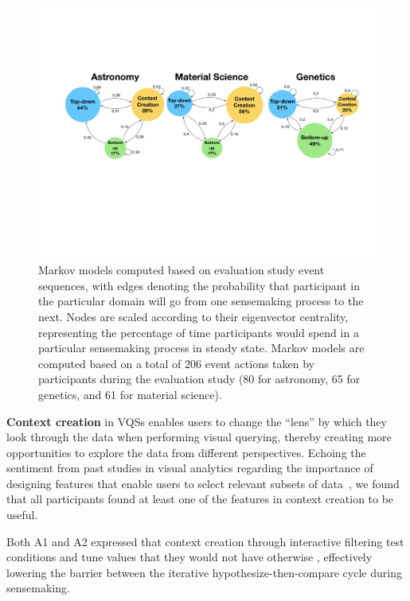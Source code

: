  \begin{figure}[ht!]
   \centering
   \includegraphics[width=0.6\linewidth]{figures/markov_transition.pdf}
   \caption{Markov models computed based on evaluation study event sequences, with edges denoting the probability that participant in the particular domain will go from one sensemaking process to the next. Nodes are scaled according to their eigenvector centrality, representing the percentage of time participants would spend in a particular sensemaking process in steady state. Markov models are computed based on a total of 206 event actions taken by participants during the evaluation study (80 for astronomy, 65 for genetics, and 61 for material science).}\label{fig:transition}
   \vspace*{-15pt}
 \end{figure}
 \par \textbf{Context creation} in VQSs enables users to change the ``lens''
 by which they look through the data
 when performing visual querying,
 thereby creating more opportunities
 to explore the data from different perspectives. Echoing the sentiment from past studies in visual analytics regarding the importance of designing features that enable users to select relevant subsets of data~\cite{Shneiderman1994,Amar2005,Heer2012}, we found that all participants found at least one of the features in context creation to be useful.
 \par Both A1 and A2 expressed that context creation through interactive filtering  test conditions and tune values that they would not have otherwise , effectively lowering the barrier between the iterative hypothesize-then-compare cycle during sensemaking.
